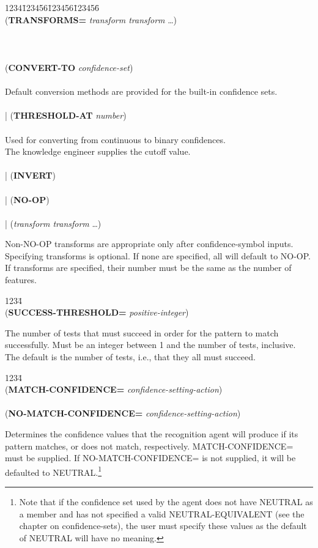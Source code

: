\begin{tabbing}
1234\=123456\=123456\=123456\= \kill
\\
({\bf TRANSFORMS=} {\it transform transform\/} \ldots) \\
\\
\\
\\
\>\>({\bf CONVERT-TO} {\it confidence-set\/}) \\
\\
\>\>\>Default conversion methods are provided for the built-in 
confidence sets. \\
\\
\>\>| ({\bf THRESHOLD-AT} {\it number\/}) \\
\\
\>\>\>Used for converting from continuous to binary confidences.\\
\>\>\>The knowledge engineer supplies the cutoff value. \\
\\
\>\>\>| ({\bf INVERT}) \\
\\
\>\>\>| ({\bf NO-OP}) \\
\\
\>\>\>| ({\it transform transform\/} \ldots)
\\
\end{tabbing}
Non-NO-OP transforms are appropriate only after confidence-symbol
inputs.  Specifying transforms is optional.  If none are specified,
all will default to NO-OP.  If transforms are specified, their number
must be the same as the number of features.

\begin{tabbing}
1234\= \kill
\\
({\bf SUCCESS-THRESHOLD=} {\it positive-integer\/})\\
\end{tabbing}
The number of tests that must succeed in order for the pattern to
match successfully.  Must be an integer between 1 and the number of
tests, inclusive.  The default is the number of tests, i.e., that they
all must succeed.

\begin{tabbing}
1234\= \kill
\\
({\bf MATCH-CONFIDENCE=} {\it confidence-setting-action\/}) \\
\\
({\bf NO-MATCH-CONFIDENCE=} {\it confidence-setting-action\/})
\end{tabbing}
Determines the confidence values that the recognition agent will
produce if its pattern matches, or does not match, respectively.
MATCH-CONFIDENCE= must be supplied.  If NO-MATCH-CONFIDENCE= is not
supplied, it will be defaulted to NEUTRAL.\footnote{Note that if the
confidence set used by the agent does not have NEUTRAL as a member and
has not specified a valid NEUTRAL-EQUIVALENT (see the chapter on
confidence-sets), the user must specify these values as the default of
NEUTRAL will have no meaning.}

